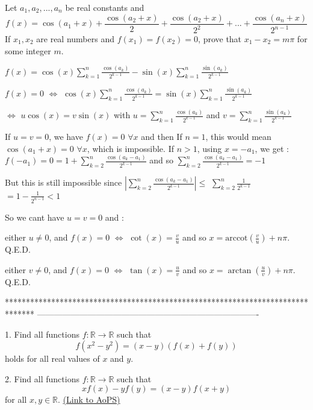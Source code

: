 \begin{solution}
	\begin{tcolorbox}Let $ a_1,a_2,...,a_n$ be real constants and
\[ f(x) = \cos(a_1 + x) + \frac {\cos(a_2 + x)}{2} + \frac {\cos(a_2 + x)}{2^2} + ... + \frac {\cos(a_n + x)}{2^{n - 1}}\]
If $ x_1,x_2$ are real numbers and $ f(x_1) = f(x_2) = 0$, prove that $ x_1 - x_2 = m\pi$ for some integer $ m$.\end{tcolorbox}

$ f(x)=\cos(x)\sum_{k=1}^n\frac{\cos(a_k)}{2^{k-1}}-\sin(x)\sum_{k=1}^n\frac{\sin(a_k)}{2^{k-1}}$

$ f(x)=0$ $ \iff$ $ \cos(x)\sum_{k=1}^n\frac{\cos(a_k)}{2^{k-1}}=\sin(x)\sum_{k=1}^n\frac{\sin(a_k)}{2^{k-1}}$

$ \iff$ $ u\cos(x)=v\sin(x)$ with $ u=\sum_{k=1}^n\frac{\cos(a_k)}{2^{k-1}}$ and $ v=\sum_{k=1}^n\frac{\sin(a_k)}{2^{k-1}}$

If $ u=v=0$, we have $ f(x)=0$ $ \forall x$ and then 
If $ n=1$, this would mean $ \cos(a_1+x)=0$ $ \forall x$, which is impossible.
If $ n>1$, using $ x=-a_1$, we get : $ f(-a_1)=0=1+\sum_{k=2}^n\frac{\cos(a_k-a_1)}{2^{k-1}}$ and so $ \sum_{k=2}^n\frac{\cos(a_k-a_1)}{2^{k-1}}=-1$

But this is still impossible since $ |\sum_{k=2}^n\frac{\cos(a_k-a_1)}{2^{k-1}}|\le$ $ \sum_{k=2}^n\frac{1}{2^{k-1}}$ $ =1-\frac 1{2^{n-1}}<1$

So we cant have $ u=v=0$ and :

either $ u\ne 0$, and $ f(x)=0$ $ \iff$ $ \cot(x)=\frac vu$ and so $ x=\text{arccot}(\frac vu)+n\pi$. Q.E.D.

either $ v\ne 0$, and $ f(x)=0$ $ \iff$ $ \tan(x)=\frac uv$ and so $ x=\arctan(\frac uv)+n\pi$. Q.E.D.
\end{solution}
*******************************************************************************
-------------------------------------------------------------------------------

\begin{problem}
	1. Find all functions $f: \mathbb R \to \mathbb R$ such that \[ f(x^2-y^2)=(x-y)(f(x)+f(y))\] holds for all real values of $x$ and $y$.

2. Find all functions $f: \mathbb R \to \mathbb R$ such that \[ xf(x)-yf(y)=(x-y)f(x+y)\] for all $x,y \in \mathbb R$.
	\flushright \href{https://artofproblemsolving.com/community/c6h309538}{(Link to AoPS)}
\end{problem}



